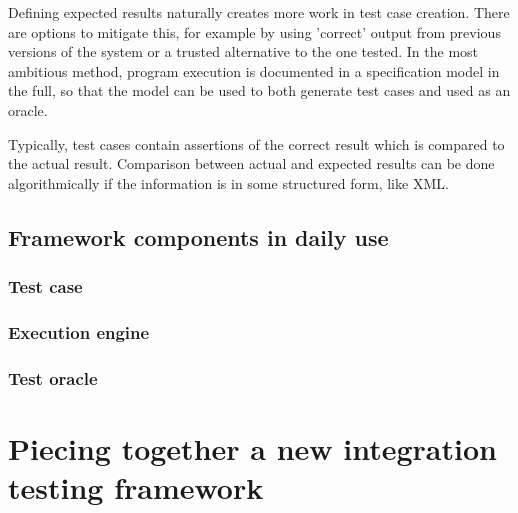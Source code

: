 \documentclass[12pt,a4paper,oneside,pdftex]{report}
\begin{document}
Defining expected results naturally creates more work in test case creation. There are options to mitigate this, for example by using 'correct' output from previous versions of the system or a trusted alternative to the one tested. In the most ambitious method, program execution is documented in a specification model in the full, so that the model can be used to both generate test cases and used as an oracle. \citep{pezze2008software}

Typically, test cases contain assertions of the correct result which is compared to the actual result. Comparison between actual and expected results can be done algorithmically if the information is in some structured form, like XML.

\section{Framework components in daily use}


\subsection{Test case}


\subsection{Execution engine}


\subsection{Test oracle}

  
\chapter{Piecing together a new integration testing framework}
\label{chapter:frameworkproposal}
\end{document}

